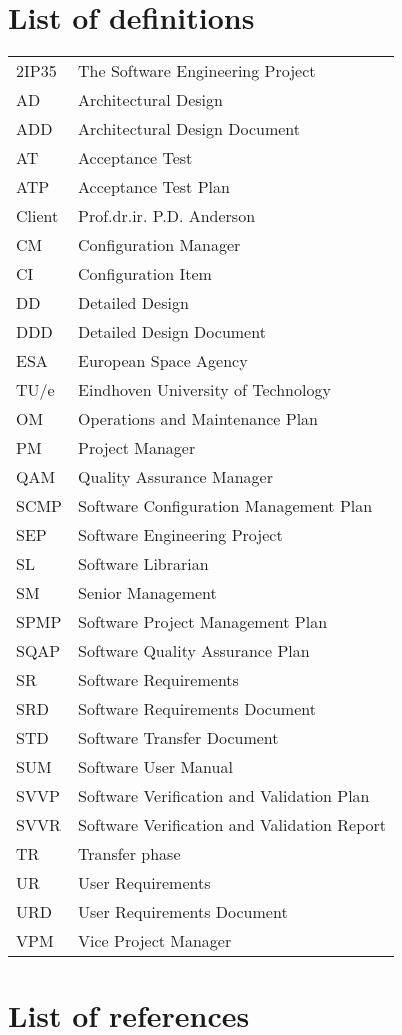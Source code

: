 \section{List of definitions}
\begin{tabular}{l|l}
2IP35 & The Software Engineering Project \\ 
AD    &Architectural Design \\ 
ADD   &Architectural Design Document \\ 
AT    &Acceptance Test \\ 
ATP   &Acceptance Test Plan \\ 
Client &Prof.dr.ir. P.D. Anderson \\ 
CM    &Configuration Manager \\ 
CI &Configuration Item\\
DD    &Detailed Design \\ 
DDD   &Detailed Design Document \\ 
ESA   &European Space Agency \\ 
TU/e  &Eindhoven University of Technology \\ 
OM    &Operations and Maintenance Plan \\ 
PM    &Project Manager \\ 
QAM &Quality Assurance Manager\\
SCMP  &Software Configuration Management Plan \\ 
SEP   &Software Engineering Project \\ 
SL    &Software Librarian \\ 
SM	  &Senior Management \\
SPMP  &Software Project Management Plan \\ 
SQAP  &Software Quality Assurance Plan \\ 
SR    &Software Requirements \\ 
SRD   &Software Requirements Document \\ 
STD   &Software Transfer Document \\ 
SUM   &Software User Manual \\ 
SVVP  &Software Verification and Validation Plan \\ 
SVVR  &Software Verification and Validation Report \\ 
TR    &Transfer phase \\ 
UR    &User Requirements \\ 
URD   &User Requirements Document \\ 
VPM   &Vice Project Manager \\ 
\end{tabular}
\section{List of references}



